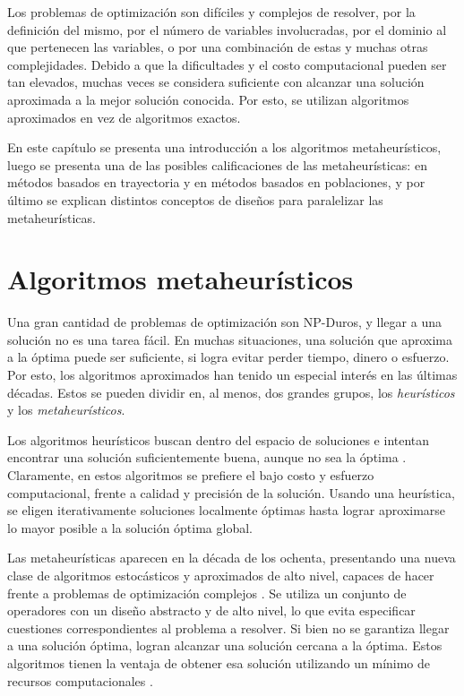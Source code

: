 Los problemas de optimización son difíciles y complejos de resolver, por la definición del mismo, por el número de variables involucradas, por el dominio al que pertenecen las variables, o por una combinación de estas y muchas otras complejidades. Debido a que la dificultades y el costo computacional pueden ser tan elevados, muchas veces se considera suficiente con alcanzar una solución aproximada a la mejor solución conocida. Por esto, se utilizan algoritmos aproximados en vez de algoritmos exactos.


En este capítulo se presenta una introducción a los algoritmos metaheurísticos, luego se presenta una de las posibles calificaciones de las metaheurísticas: en métodos basados en trayectoria y en métodos basados en poblaciones, y por último se explican distintos conceptos de diseños para paralelizar las metaheurísticas.


\section{Algoritmos metaheurísticos}


Una gran cantidad de problemas de optimización son NP-Duros, \cite{GareyJohnsonTheoryNP} y llegar a una solución no es una tarea fácil. En muchas situaciones, una solución que aproxima a la óptima puede ser suficiente, si logra evitar perder tiempo, dinero o esfuerzo. Por esto, los algoritmos aproximados han tenido un especial interés en las últimas décadas. Estos se pueden dividir en, al menos, dos grandes grupos, los \textit{heurísticos} y los \textit{metaheurísticos}.


Los algoritmos heurísticos buscan dentro del espacio de soluciones e intentan encontrar una solución suficientemente buena, aunque no sea la óptima \cite{Brownlee}. Claramente, en estos algoritmos se prefiere el bajo costo y esfuerzo computacional, frente a calidad y precisión de la solución. Usando una heurística, se eligen iterativamente soluciones localmente óptimas hasta lograr aproximarse lo mayor posible a la solución óptima global. 


Las metaheurísticas aparecen en la década de los ochenta, presentando una nueva clase de algoritmos estocásticos y aproximados de alto nivel, capaces de hacer frente a problemas de optimización complejos \cite{BlumRoli}. Se utiliza un conjunto de operadores con un diseño abstracto y de alto nivel, lo que evita especificar cuestiones correspondientes al problema a resolver. Si bien no se garantiza llegar a una solución óptima, logran alcanzar una solución cercana a la óptima. Estos algoritmos tienen la ventaja de obtener esa solución utilizando un mínimo de recursos computacionales \cite{Garcia-Nieto}.


